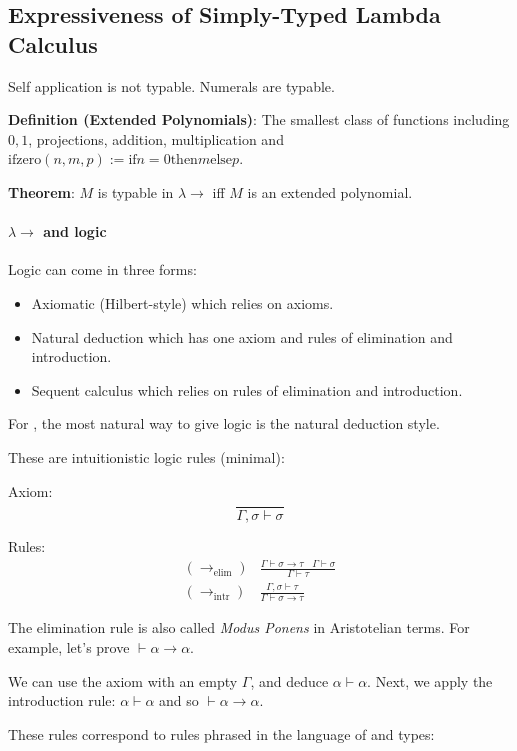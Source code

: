 \subsection{Expressiveness of Simply-Typed Lambda Calculus}
Self application is not typable. Numerals are typable.

\textbf{Definition (Extended Polynomials)}: The smallest class of functions including $0, 1$, projections,
addition, multiplication and $\mathrm{ifzero}(n, m, p) := \mathrm{if} n = 0 \mathrm{then} m \mathrm{else} p$.

\textbf{Theorem}: $M$ is typable in $\lambda \to$ iff $M$ is an extended polynomial.

\paragraph{$\lambda\to$ and logic}
Logic can come in three forms:
\begin{itemize}
\item Axiomatic (Hilbert-style) which relies on axioms.
\item Natural deduction which has one axiom and rules of elimination and introduction.
\item Sequent calculus which relies on rules of elimination and introduction.
\end{itemize}

For \lc, the most natural way to give logic is the natural deduction style. 

These are intuitionistic logic rules (minimal):

Axiom:
\[
\frac{}{\Gamma, \sigma \vdash \sigma}
\]

Rules:
\[
\begin{array}{cc}
(\to_\mathrm{elim})&\frac{\Gamma \vdash \sigma \to \tau~~~~\Gamma \vdash \sigma}{\Gamma \vdash \tau} \\
(\to_\mathrm{intr})&\frac{\Gamma, \sigma \vdash \tau}{\Gamma \vdash \sigma \to \tau}
\end{array}
\]

The elimination rule is also called \emph{Modus Ponens} in Aristotelian terms. For example, let's prove $\vdash \alpha \to \alpha$.

We can use the axiom with an empty $\Gamma$, and deduce $\alpha \vdash \alpha$. Next, we apply the introduction
rule: $\alpha \vdash \alpha$ and so $\vdash \alpha \to \alpha$.

These rules correspond to rules phrased in the language of \lc and types:

